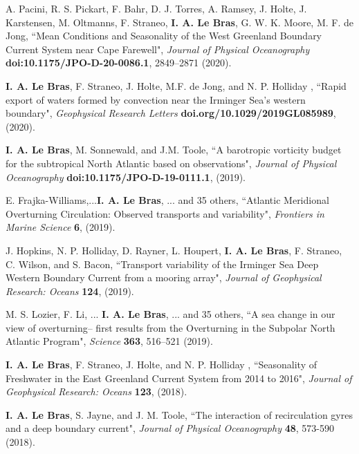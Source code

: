 \documentclass[paper=letter,fontsize=11pt]{scrartcl} %
\newcommand{\PaperEntry}[6]{
		\noindent #1, ``#2", \textit{#3} \textbf{#4}, #5 (#6).}
\begin{document}
\begin{etaremune}

\item \PaperEntry{A. Pacini, R. S. Pickart, F. Bahr, D. J. Torres, A. Ramsey, J. Holte, J. Karstensen, M. Oltmanns, F. Straneo, \textbf{I. A. Le Bras}, G. W. K. Moore, M. F. de Jong}{Mean Conditions and Seasonality of the West Greenland Boundary Current System near Cape Farewell}{Journal of Physical Oceanography}{doi:10.1175/JPO-D-20-0086.1}{2849--2871}{2020}

\item \PaperEntry{\textbf{I. A. Le Bras}, F. Straneo, J. Holte, M.F. de Jong, and N. P. Holliday }{Rapid export of waters formed by convection near the Irminger Sea's western boundary}{Geophysical Research Letters}{doi.org/10.1029/2019GL085989}{}{2020}

\item \PaperEntry{\textbf{I. A. Le Bras}, M. Sonnewald, and J.M. Toole}{A barotropic vorticity budget for the subtropical North Atlantic based on observations}{Journal of Physical Oceanography}{doi:10.1175/JPO-D-19-0111.1}{}{2019}

\item \PaperEntry{E. Frajka-Williams,...\textbf{I. A. Le Bras}, ... and 35 others}{Atlantic Meridional Overturning Circulation: Observed transports and variability}{Frontiers in Marine Science}{6}{}{2019}

\item \PaperEntry{J. Hopkins, N. P. Holliday, D. Rayner, L. Houpert, \textbf{I. A. Le Bras}, F. Straneo, C. Wilson, and S. Bacon}{Transport variability of the Irminger Sea Deep Western Boundary Current from a mooring array}{Journal of Geophysical Research: Oceans}{124}{}{2019}

\item \PaperEntry{M. S. Lozier, F.  Li, ... \textbf{I. A. Le Bras}, ... and 35 others}{A sea change in our view of overturning– first results from the
Overturning in the Subpolar North Atlantic Program}{Science}{363}{516--521}{2019}

\item \PaperEntry{\textbf{I. A. Le Bras}, F. Straneo, J. Holte, and N. P. Holliday }{Seasonality of Freshwater in the East Greenland Current
System from 2014 to 2016}{Journal of Geophysical Research: Oceans}{123}{}{2018}

\item \PaperEntry{\textbf{I. A. Le Bras}, S. Jayne, and J. M. Toole}{The interaction of recirculation gyres and a deep boundary current}{Journal of Physical Oceanography}{48}{573-590}{2018}
	

\end{etaremune}
\end{document}
